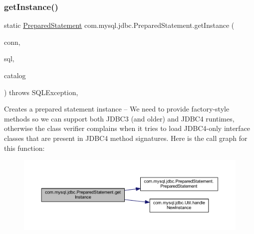 \subsubsection{\texorpdfstring{get\+Instance()}{getInstance()}\hspace{0.1cm}{\footnotesize\ttfamily [2/3]}}
{\footnotesize\ttfamily static \mbox{\hyperlink{classcom_1_1mysql_1_1jdbc_1_1_prepared_statement}{Prepared\+Statement}} com.\+mysql.\+jdbc.\+Prepared\+Statement.\+get\+Instance (\begin{DoxyParamCaption}\item[{\mbox{\hyperlink{interfacecom_1_1mysql_1_1jdbc_1_1_my_s_q_l_connection}{My\+S\+Q\+L\+Connection}}}]{conn,  }\item[{String}]{sql,  }\item[{String}]{catalog }\end{DoxyParamCaption}) throws S\+Q\+L\+Exception\hspace{0.3cm}{\ttfamily [static]}, {\ttfamily [protected]}}

Creates a prepared statement instance -- We need to provide factory-\/style methods so we can support both J\+D\+B\+C3 (and older) and J\+D\+B\+C4 runtimes, otherwise the class verifier complains when it tries to load J\+D\+B\+C4-\/only interface classes that are present in J\+D\+B\+C4 method signatures. Here is the call graph for this function\+:
\nopagebreak
\begin{figure}[H]
\begin{center}
\leavevmode
\includegraphics[width=350pt]{classcom_1_1mysql_1_1jdbc_1_1_prepared_statement_a597b46826cbe709aaee73ee7ccb1ab85_cgraph}
\end{center}
\end{figure}
\mbox{\label{classcom_1_1mysql_1_1jdbc_1_1_prepared_statement_a37bdcf9e02a649454447143c8b6361d7}} 
